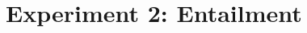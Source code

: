 \documentclass[11pt,fleqn]{article}
\newcommand{\6}{\mbox{$[\hspace*{-.6mm}[$}}
\newcommand{\9}{\mbox{$]\hspace*{-.6mm}]$}}
\begin{document}








 
\section{Experiment 2: Entailment}\label{s3}
\end{document}
